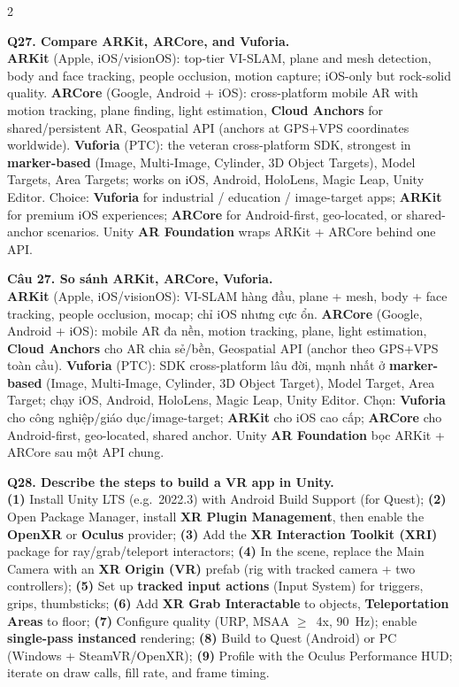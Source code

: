 \begin{paracol}{2}
\switchcolumn*

\textbf{Q27. Compare ARKit, ARCore, and Vuforia.}\\
\textbf{ARKit} (Apple, iOS/visionOS): top-tier VI-SLAM, plane and mesh detection, body and face tracking, people occlusion, motion capture; iOS-only but rock-solid quality. \textbf{ARCore} (Google, Android + iOS): cross-platform mobile AR with motion tracking, plane finding, light estimation, \textbf{Cloud Anchors} for shared/persistent AR, Geospatial API (anchors at GPS+VPS coordinates worldwide). \textbf{Vuforia} (PTC): the veteran cross-platform SDK, strongest in \textbf{marker-based} (Image, Multi-Image, Cylinder, 3D Object Targets), Model Targets, Area Targets; works on iOS, Android, HoloLens, Magic Leap, Unity Editor. Choice: \textbf{Vuforia} for industrial / education / image-target apps; \textbf{ARKit} for premium iOS experiences; \textbf{ARCore} for Android-first, geo-located, or shared-anchor scenarios. Unity \textbf{AR Foundation} wraps ARKit + ARCore behind one API.

\switchcolumn

\textbf{Câu 27. So sánh ARKit, ARCore, Vuforia.}\\
\textbf{ARKit} (Apple, iOS/visionOS): VI-SLAM hàng đầu, plane + mesh, body + face tracking, people occlusion, mocap; chỉ iOS nhưng cực ổn. \textbf{ARCore} (Google, Android + iOS): mobile AR đa nền, motion tracking, plane, light estimation, \textbf{Cloud Anchors} cho AR chia sẻ/bền, Geospatial API (anchor theo GPS+VPS toàn cầu). \textbf{Vuforia} (PTC): SDK cross-platform lâu đời, mạnh nhất ở \textbf{marker-based} (Image, Multi-Image, Cylinder, 3D Object Target), Model Target, Area Target; chạy iOS, Android, HoloLens, Magic Leap, Unity Editor. Chọn: \textbf{Vuforia} cho công nghiệp/giáo dục/image-target; \textbf{ARKit} cho iOS cao cấp; \textbf{ARCore} cho Android-first, geo-located, shared anchor. Unity \textbf{AR Foundation} bọc ARKit + ARCore sau một API chung.

\switchcolumn*

\textbf{Q28. Describe the steps to build a VR app in Unity.}\\
\textbf{(1)} Install Unity LTS (e.g.\ 2022.3) with Android Build Support (for Quest); \textbf{(2)} Open Package Manager, install \textbf{XR Plugin Management}, then enable the \textbf{OpenXR} or \textbf{Oculus} provider; \textbf{(3)} Add the \textbf{XR Interaction Toolkit (XRI)} package for ray/grab/teleport interactors; \textbf{(4)} In the scene, replace the Main Camera with an \textbf{XR Origin (VR)} prefab (rig with tracked camera + two controllers); \textbf{(5)} Set up \textbf{tracked input actions} (Input System) for triggers, grips, thumbsticks; \textbf{(6)} Add \textbf{XR Grab Interactable} to objects, \textbf{Teleportation Areas} to floor; \textbf{(7)} Configure quality (URP, MSAA $\geq$~4x, 90~Hz); enable \textbf{single-pass instanced} rendering; \textbf{(8)} Build to Quest (Android) or PC (Windows + SteamVR/OpenXR); \textbf{(9)} Profile with the Oculus Performance HUD; iterate on draw calls, fill rate, and frame timing.


\end{paracol}
